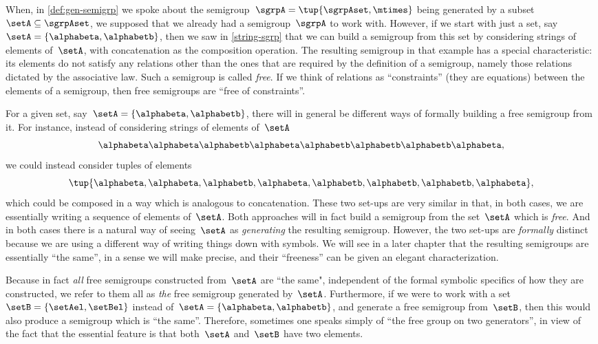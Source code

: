 When, in \cref{def:gen-semigrp} we spoke about the semigroup~$\sgrpA = \tup{\sgrpAset, \mtimes}$  being generated by a subset~$\setA \subseteq \sgrpAset$, we supposed that we already had a semigroup~$\sgrpA$ to work with.
However, if we start with just a set, say~$\setA = \{ \alphabeta, \alphabetb\}$, then we saw in \cref{string-sgrp} that we can build a semigroup from this set by considering strings of elements of~$\setA$, with concatenation as the composition operation.
The resulting semigroup in that example has a special characteristic: its elements do not satisfy any relations other than the ones that are required by the definition of a semigroup, namely those relations dictated by the associative law.
Such a semigroup is called \emph{free}.
If we think of relations as ``constraints'' (they are equations) between the elements of a semigroup, then free semigroups are ``free of constraints''.

For a given set, say~$\setA = \{ \alphabeta, \alphabetb\}$, there will in general be different ways of formally building a free semigroup from it.
For instance, instead of considering strings of elements of~$\setA$
\begin{equation}
	\alphabeta\alphabeta \alphabetb \alphabeta \alphabetb \alphabetb \alphabetb \alphabeta,
\end{equation}
we could instead consider tuples of elements
\begin{equation}
	\tup{ \alphabeta, \alphabeta,  \alphabetb,  \alphabeta,  \alphabetb,  \alphabetb,  \alphabetb,  \alphabeta},
\end{equation}
which could be composed in a way which is analogous to concatenation.
These two set-ups are very similar in that, in both cases, we are essentially writing a sequence of elements of~$\setA$.
Both approaches will in fact build a semigroup from the set~$\setA$ which is \emph{free}.
And in both cases there is a natural way of seeing~$\setA$ as \emph{generating} the resulting semigroup.
However, the two set-ups are \emph{formally} distinct because we are using a different way of writing things down with symbols.
We will see in a later chapter that the resulting semigroups are essentially ``the same'', in a sense we will make precise, and their ``freeness'' can be given an elegant characterization.

Because in fact \emph{all} free semigroups constructed from~$\setA$ are ``the same", independent of the formal symbolic specifics of how they are constructed, we refer to them all as \emph{the} free semigroup generated by~$\setA$.
Furthermore, if we were to work with a set~$\setB = \{ \setAel, \setBel \}$ instead of~$\setA = \{ \alphabeta, \alphabetb\}$, and generate a free semigroup from~$\setB$, then this would also produce a semigroup which is ``the same''.
Therefore, sometimes one speaks simply of ``the free group on two generators'', in view of the fact that the essential feature is that both~$\setA$ and~$\setB$ have two elements.

